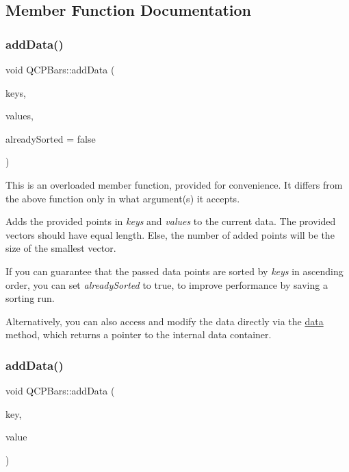 \subsection{Member Function Documentation}
\mbox{\label{class_q_c_p_bars_a323d6970d6d6e3166d89916a7f60f733}} 
\subsubsection{\texorpdfstring{add\+Data()}{addData()}\hspace{0.1cm}{\footnotesize\ttfamily [1/2]}}
{\footnotesize\ttfamily void Q\+C\+P\+Bars\+::add\+Data (\begin{DoxyParamCaption}\item[{const \hyperlink{class_q_vector}{Q\+Vector}$<$ double $>$ \&}]{keys,  }\item[{const \hyperlink{class_q_vector}{Q\+Vector}$<$ double $>$ \&}]{values,  }\item[{bool}]{already\+Sorted = {\ttfamily false} }\end{DoxyParamCaption})}

This is an overloaded member function, provided for convenience. It differs from the above function only in what argument(s) it accepts.

Adds the provided points in {\itshape keys} and {\itshape values} to the current data. The provided vectors should have equal length. Else, the number of added points will be the size of the smallest vector.

If you can guarantee that the passed data points are sorted by {\itshape keys} in ascending order, you can set {\itshape already\+Sorted} to true, to improve performance by saving a sorting run.

Alternatively, you can also access and modify the data directly via the \hyperlink{class_q_c_p_bars_a7e373a534d82e18ed27b3fafd1f08fae}{data} method, which returns a pointer to the internal data container. \mbox{\label{class_q_c_p_bars_a684dd105403a5497fda42f2094fecbb7}} 
\subsubsection{\texorpdfstring{add\+Data()}{addData()}\hspace{0.1cm}{\footnotesize\ttfamily [2/2]}}
{\footnotesize\ttfamily void Q\+C\+P\+Bars\+::add\+Data (\begin{DoxyParamCaption}\item[{double}]{key,  }\item[{double}]{value }\end{DoxyParamCaption})}

